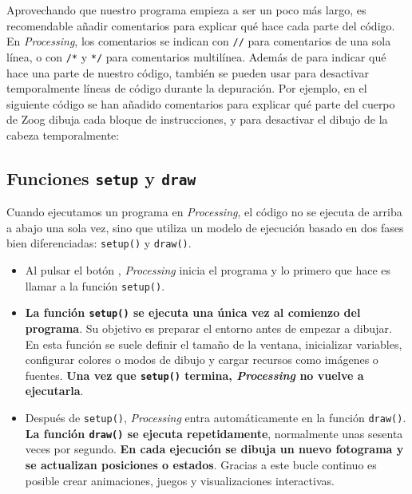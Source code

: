 \documentclass[
  spanish,
  11pt,
  a4paper,
  DIV=11,
  numbers=noendperiod]{scrartcl}
\providecommand{\tightlist}{%
  \setlength{\itemsep}{0pt}\setlength{\parskip}{0pt}}
\begin{document}
Aprovechando que nuestro programa empieza a ser un poco más largo, es recomendable añadir comentarios para explicar qué hace cada parte del código. En \emph{Processing}, los comentarios se indican con \texttt{//} para comentarios de una sola línea, o con \texttt{/*} y \texttt{*/} para comentarios multilínea. Además de para indicar qué hace una parte de nuestro código, también se pueden usar para desactivar temporalmente líneas de código durante la depuración. Por ejemplo, en el siguiente código se han añadido comentarios para explicar qué parte del cuerpo de Zoog dibuja cada bloque de instrucciones, y para desactivar el dibujo de la cabeza temporalmente:


\subsection{\texorpdfstring{Funciones \texttt{setup} y \texttt{draw}}{Funciones setup y draw}}

\label{funciones-setup-y-draw}

Cuando ejecutamos un programa en \emph{Processing}, el código no se ejecuta de arriba a abajo una sola vez, sino que utiliza un modelo de ejecución basado en dos fases bien diferenciadas: \texttt{setup()} y \texttt{draw()}.

\begin{itemize}
\tightlist
\item
  Al pulsar el botón , \emph{Processing} inicia el programa y lo primero que hace es llamar a la función \texttt{setup()}.
\item
  \textbf{La función \texttt{setup()} se ejecuta una única vez al comienzo del programa}. Su objetivo es preparar el entorno antes de empezar a dibujar. En esta función se suele definir el tamaño de la ventana, inicializar variables, configurar colores o modos de dibujo y cargar recursos como imágenes o fuentes. \textbf{Una vez que \texttt{setup()} termina, \emph{Processing} no vuelve a ejecutarla}.
\item
  Después de \texttt{setup()}, \emph{Processing} entra automáticamente en la función \texttt{draw()}. \textbf{La función \texttt{draw()} se ejecuta repetidamente}, normalmente unas sesenta veces por segundo. \textbf{En cada ejecución se dibuja un nuevo fotograma y se actualizan posiciones o estados}. Gracias a este bucle continuo es posible crear animaciones, juegos y visualizaciones interactivas.
\end{itemize}
\end{document}
